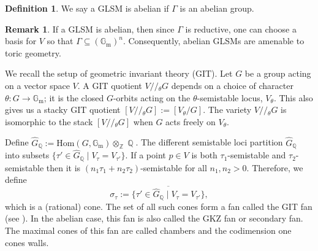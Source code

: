 \documentclass[reqno, 12pt]{amsart}
\theoremstyle{definition}
\newtheorem{definition}[theorem]{Definition}
\newtheorem{remark}[theorem]{Remark}
\newcommand{\op}[1]{\operatorname{#1}}
\newcommand{\modmod}[1]{/ \! \! / \!_{#1}}
\newcommand{\newterm}{\textsf}
\newcommand{\Hom}{\text{Hom}}
\def\Z{\op{\mathbb{Z}}}
\def\Q{\op{\mathbb{Q}}}
\def\Gm{\op{\mathbb{G}_m}}
\def\n{n}
\numberwithin{equation}{section}
\begin{document}
\begin{definition}
We say a GLSM is \newterm{abelian} if $\Gamma$ is an abelian group. 
\end{definition}

 \begin{remark}If a GLSM is abelian, then since $\Gamma$ is reductive, one can choose a basis for $V$ so that $\Gamma \subseteq (\Gm)^{\n}$. Consequently, abelian GLSMs are amenable to toric geometry.\end{remark}

We recall the setup of geometric invariant theory (GIT). Let $G$ be a group acting on a vector space $V$. A GIT quotient $V\modmod{\theta} G$ depends on a choice of character $\theta: G \rightarrow \Gm$; it is the closed $G$-orbits acting on the $\theta$-semistable locus, $V_{\theta}$. This also gives us a stacky GIT quotient $[V\modmod{\theta}G] := [V_\theta/G]$.  The variety $V\modmod{\theta}G$ is isomorphic to the stack $[V\modmod{\theta}G]$ when $G$ acts freely on $V_\theta$.

Define $\widehat{G}_{\Q} := \Hom(G, \Gm) \otimes_{\Z} \Q$. The different semistable loci partition $\widehat{G}_{\Q}$ into subsets
$\{ \tau' \in \widehat{G}_{\Q} \mid V_{\tau} = V_{\tau'} \}.$
If a point $p \in V$ is both $\tau_1$-semistable and $\tau_2$-semistable then it is $(n_1 \tau_1 + n_2 \tau_2)$-semistable for all $n_1, n_2 > 0$. Therefore, we define 
\[
\sigma_\tau:= \overline{\{ \tau' \in \widehat{G}_{\Q} \mid V_{\tau} = V_{\tau'} \}},
\]
which is a (rational) cone. The set of all such cones form a fan called the \newterm{GIT fan} (see \cite{Ress00}).  In the abelian case, this fan is also called the GKZ fan or secondary fan. The maximal cones of this fan are called \newterm{chambers} and the codimension one cones \newterm{walls}.
\end{document}
